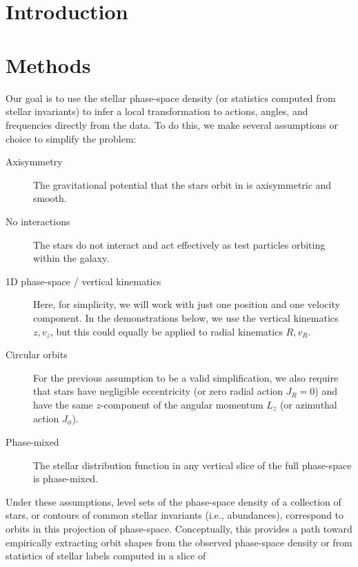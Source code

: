 
\section*{~}\clearpage

\section{Introduction} \label{sec:intro}


\section{Methods} \label{sec:methods}

Our goal is to use the stellar phase-space density (or statistics computed from stellar
invariants) to infer a local transformation to actions, angles, and frequencies directly
from the data.
To do this, we make several assumptions or choice to simplify the problem:
\begin{description}
    \item[Axisymmetry] The gravitational potential that the stars orbit in is
    axisymmetric and smooth.
    \item[No interactions] The stars do not interact and act effectively as test
    particles orbiting within the galaxy.
    \item[1D phase-space / vertical kinematics] Here, for simplicity, we will work with
    just one position and one velocity component. In the demonstrations below, we use
    the vertical kinematics $z, v_z$, but this could equally be applied to radial
    kinematics $R, v_R$.
    \item[Circular orbits] For the previous assumption to be a valid simplification, we
    also require that stars have negligible eccentricity (or zero radial action $J_R=0$)
    and have the same $z$-component of the angular momentum $L_z$ (or azimuthal action
    $J_\phi$).
    \item[Phase-mixed] The stellar distribution function in any vertical slice of
    the full phase-space is phase-mixed.
\end{description}
Under these assumptions, level sets of the phase-space density of a collection of stars,
or contours of common stellar invariants (i.e., abundances), correspond to orbits in
this projection of phase-space.
Conceptually, this provides a path toward empirically extracting orbit shapes from the
observed phase-space density or from statistics of stellar labels computed in a slice of
